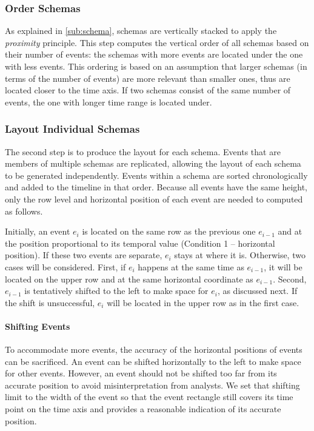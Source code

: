 \subsubsection{Order Schemas}
As explained in \autoref{sub:schema}, schemas are vertically stacked to apply the \emph{proximity} principle. This step computes the vertical order of all schemas based on their number of events: the schemas with more events are located under the one with less events. This ordering is based on an assumption that larger schemas (in terms of the number of events) are more relevant than smaller ones, thus are located closer to the time axis. If two schemas consist of the same number of events, the one with longer time range is located under.

\subsubsection{Layout Individual Schemas}
\label{sub:layout-schema}
The second step is to produce the layout for each schema. Events that are members of multiple schemas are replicated, allowing the layout of each schema to be generated independently. Events within a schema are sorted chronologically and added to the timeline in that order. Because all events have the same height, only the row level and horizontal position of each event are needed to computed as follows. 

Initially, an event $e_i$ is located on the same row as the previous one $e_{i-1}$ and at the position proportional to its temporal value (Condition 1 -- horizontal position). If these two events are separate, $e_i$ stays at where it is. Otherwise, two cases will be considered. First, if $e_i$ happens at the same time as $e_{i-1}$, it will be located on the upper row and at the same horizontal coordinate as $e_{i-1}$. Second, $e_{i-1}$ is tentatively shifted to the left to make space for $e_i$, as discussed next. If the shift is unsuccessful, $e_i$ will be located in the upper row as in the first case.

\paragraph*{Shifting Events}
To accommodate more events, the accuracy of the horizontal positions of events can be sacrificed. An event can be shifted horizontally to the left to make space for other events. However, an event should not be shifted too far from its accurate position to avoid misinterpretation from analysts. We set that shifting limit to the width of the event so that the event rectangle still covers its time point on the time axis and provides a reasonable indication of its accurate position. 

